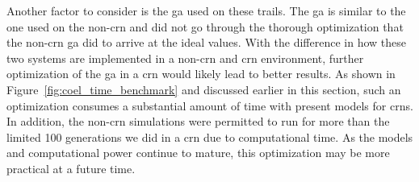 Another factor to consider is the \gls{ga} used on these trails. The \gls{ga} is similar to the one used on the non-\gls{crn} and did not go through the thorough optimization that the non-\gls{crn} \gls{ga} did to arrive at the ideal values. With the difference in how these two systems are implemented in a non-\gls{crn} and \gls{crn} environment, further optimization of the \gls{ga} in a \gls{crn} would likely lead to better results. As shown in Figure~\ref{fig:coel_time_benchmark} and discussed earlier in this section,  such an optimization consumes a substantial amount of time with present models for \glspl{crn}. In addition, the non-\gls{crn} simulations were permitted to run for more than the limited 100 generations we did in a \gls{crn} due to computational time. As the models and computational power continue to mature, this optimization may be more practical at a future time.

